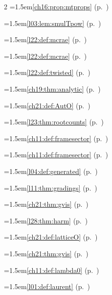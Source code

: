 \begin{multicols}{2}
\hangindent=1.5em\quad \ref{ch16:prop:mtprops} (p.~\pageref{ch16:prop:mtprops})\par
\hangindent=1.5em\quad \ref{l03:lem:smulTpow} (p.~\pageref{l03:lem:smulTpow})\par
\hangindent=1.5em\quad \ref{l22:def:mcrae} (p.~\pageref{l22:def:mcrae})\par
\hangindent=1.5em\quad \ref{l22:def:mcrae} (p.~\pageref{l22:def:mcrae})\par
\hangindent=1.5em\quad \ref{l22:def:twisted} (p.~\pageref{l22:def:twisted})\par
\hangindent=1.5em\quad \ref{ch19:thm:analytic} (p.~\pageref{ch19:thm:analytic})\par
\hangindent=1.5em\quad \ref{ch21:def:AutO} (p.~\pageref{ch21:def:AutO})\par
\hangindent=1.5em\quad \ref{l23:thm:rootcounts} (p.~\pageref{l23:thm:rootcounts})\par
\hangindent=1.5em\quad \ref{ch11:def:framesector} (p.~\pageref{ch11:def:framesector})\par
\hangindent=1.5em\quad \ref{ch11:def:framesector} (p.~\pageref{ch11:def:framesector})\par
\hangindent=1.5em\quad \ref{l04:def:generated} (p.~\pageref{l04:def:generated})\par
\hangindent=1.5em\quad \ref{l11:thm:gradings} (p.~\pageref{l11:thm:gradings})\par
\hangindent=1.5em\quad \ref{ch21:thm:gvis} (p.~\pageref{ch21:thm:gvis})\par
\hangindent=1.5em\quad \ref{l28:thm:harm} (p.~\pageref{l28:thm:harm})\par
\hangindent=1.5em\quad \ref{ch21:def:latticeO} (p.~\pageref{ch21:def:latticeO})\par
\hangindent=1.5em\quad \ref{ch21:thm:gvis} (p.~\pageref{ch21:thm:gvis})\par
\hangindent=1.5em\quad \ref{ch11:def:lambda0} (p.~\pageref{ch11:def:lambda0})\par
\hangindent=1.5em\quad \ref{l01:def:laurent} (p.~\pageref{l01:def:laurent})\par

\end{multicols}
